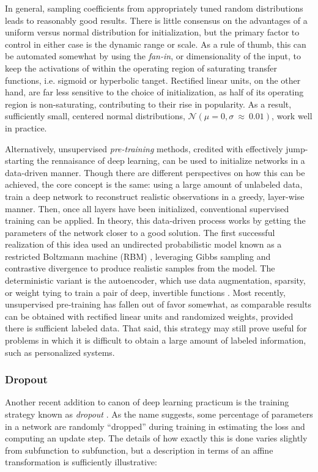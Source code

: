 In general, sampling coefficients from appropriately tuned random distributions leads to reasonably good results.
There is little consensus on the advantages of a uniform versus normal distribution for initialization, but the primary factor to control in either case is the dynamic range or scale.
As a rule of thumb, this can be automated somewhat by using the \emph{fan-in}, or dimensionality of the input, to keep the activations of within the operating region of saturating transfer functions, i.e. sigmoid or hyperbolic tanget.
Rectified linear units, on the other hand, are far less sensitive to the choice of initialization, as half of its operating region is non-saturating, contributing to their rise in popularity.
As a result, sufficiently small, centered normal distributions, $\mathcal{N}(\mu=0, \sigma~\approx~0.01)$, work well in practice.

Alternatively, unsupervised \emph{pre-training} methods, credited with effectively jump-starting the rennaisance of deep learning, can be used to initialize networks in a data-driven manner.
Though there are different perspectives on how this can be achieved, the core concept is the same:
using a large amount of unlabeled data, train a deep network to reconstruct realistic observations in a greedy, layer-wise manner.
Then, once all layers have been initialized, conventional supervised training can be applied.
In theory, this data-driven process works by getting the parameters of the network closer to a good solution.
The first successful realization of this idea used an undirected probabilistic model known as a restricted Boltzmann machine (RBM) \cite{Hinton2006}, leveraging Gibbs sampling and contrastive divergence to produce realistic samples from the model.
The deterministic variant is the autoencoder, which use data augmentation, sparsity, or weight tying to train a pair of deep, invertible functions \cite{Courville, Bengio, Vincent}.
Most recently, unsupervised pre-training has fallen out of favor somewhat, as comparable results can be obtained with rectified linear units and randomized weights, provided there is sufficient labeled data.
That said, this strategy may still prove useful for problems in which it is difficult to obtain a large amount of labeled information, such as personalized systems.


\subsubsection{Dropout}

Another recent addition to canon of deep learning practicum is the training strategy known as \emph{dropout} \cite{Hinton2012}.
As the name suggests, some percentage of parameters in a network are randomly ``dropped'' during training in estimating the loss and computing an update step.
The details of how exactly this is done varies slightly from subfunction to subfunction, but a description in terms of an affine transformation is sufficiently illustrative:


